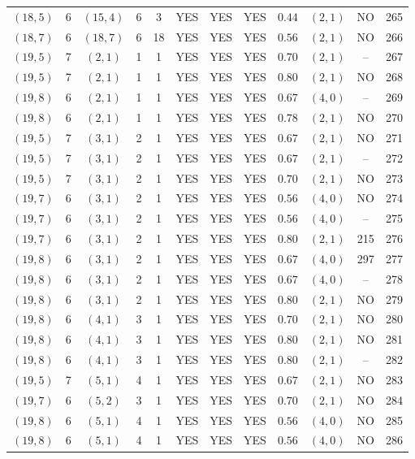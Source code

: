 \begin{longtable}{|c|c|c|c|c|c|c|c|c|c|c|c|}
$(18,5)$ & 6 & $(15,4)$ & 6 & 3 & YES & YES & YES & $0.44$ & $(2,1)$ & NO & 265\\
$(18,7)$ & 6 & $(18,7)$ & 6 & 18 & YES & YES & YES & $0.56$ & $(2,1)$ & NO & 266\\
$(19,5)$ & 7 & $(2,1)$ & 1 & 1 & YES & YES & YES & $0.70$ & $(2,1)$ & -- & 267\\
$(19,5)$ & 7 & $(2,1)$ & 1 & 1 & YES & YES & YES & $0.80$ & $(2,1)$ & NO & 268\\
$(19,8)$ & 6 & $(2,1)$ & 1 & 1 & YES & YES & YES & $0.67$ & $(4,0)$ & -- & 269\\
$(19,8)$ & 6 & $(2,1)$ & 1 & 1 & YES & YES & YES & $0.78$ & $(2,1)$ & NO & 270\\
$(19,5)$ & 7 & $(3,1)$ & 2 & 1 & YES & YES & YES & $0.67$ & $(2,1)$ & NO & 271\\
$(19,5)$ & 7 & $(3,1)$ & 2 & 1 & YES & YES & YES & $0.67$ & $(2,1)$ & -- & 272\\
$(19,5)$ & 7 & $(3,1)$ & 2 & 1 & YES & YES & YES & $0.70$ & $(2,1)$ & NO & 273\\
$(19,7)$ & 6 & $(3,1)$ & 2 & 1 & YES & YES & YES & $0.56$ & $(4,0)$ & NO & 274\\
$(19,7)$ & 6 & $(3,1)$ & 2 & 1 & YES & YES & YES & $0.56$ & $(4,0)$ & -- & 275\\
$(19,7)$ & 6 & $(3,1)$ & 2 & 1 & YES & YES & YES & $0.80$ & $(2,1)$ & 215 & 276\\
$(19,8)$ & 6 & $(3,1)$ & 2 & 1 & YES & YES & YES & $0.67$ & $(4,0)$ & 297 & 277\\
$(19,8)$ & 6 & $(3,1)$ & 2 & 1 & YES & YES & YES & $0.67$ & $(4,0)$ & -- & 278\\
$(19,8)$ & 6 & $(3,1)$ & 2 & 1 & YES & YES & YES & $0.80$ & $(2,1)$ & NO & 279\\
$(19,8)$ & 6 & $(4,1)$ & 3 & 1 & YES & YES & YES & $0.70$ & $(2,1)$ & NO & 280\\
$(19,8)$ & 6 & $(4,1)$ & 3 & 1 & YES & YES & YES & $0.80$ & $(2,1)$ & NO & 281\\
$(19,8)$ & 6 & $(4,1)$ & 3 & 1 & YES & YES & YES & $0.80$ & $(2,1)$ & -- & 282\\
$(19,5)$ & 7 & $(5,1)$ & 4 & 1 & YES & YES & YES & $0.67$ & $(2,1)$ & NO & 283\\
$(19,7)$ & 6 & $(5,2)$ & 3 & 1 & YES & YES & YES & $0.70$ & $(2,1)$ & NO & 284\\
$(19,8)$ & 6 & $(5,1)$ & 4 & 1 & YES & YES & YES & $0.56$ & $(4,0)$ & NO & 285\\
$(19,8)$ & 6 & $(5,1)$ & 4 & 1 & YES & YES & YES & $0.56$ & $(4,0)$ & NO & 286\\

\end{longtable}
